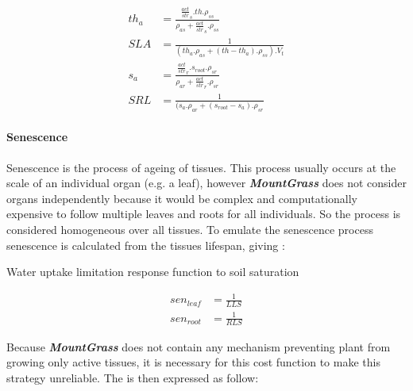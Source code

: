 \documentclass[a4paper,twoside, justified,marginals=raggedright, nobib]{tufte-handout}
\newcommand{\model}{\textit{\textbf{MountGrass }}}
\begin{document}
\begin{align}
  th_{a} &= \frac{\frac{act}{str}_{s} . th . \rho_{ss}}{\rho_{as} + \frac{act}{str}_{s} . \rho_{ss} }\\
  SLA &= \frac{1}{(th_{a} . \rho_{as} + (th - th_{a}) . \rho_{ss} ) . V_{t}}\\ 
  s_{a} &= \frac{\frac{act}{str}_{r} . s_{root} . \rho_{sr} }{ \rho_{ar} + \frac{act}{str}_{r} . \rho_{sr}}\\
  SRL &= \frac{1}{(s_{a} . \rho_{ar} + (s_{root} - s_{a}) . \rho_{sr}}
\end{align}


\paragraph{Senescence}

Senescence is the process of ageing of tissues. This process usually occurs at the scale of an individual organ (e.g. a leaf), however \model does not consider organs independently because it would be complex and computationally expensive to follow multiple leaves and roots for all individuals. So the process is considered homogeneous over all tissues. To emulate the senescence process senescence is calculated from the tissues lifespan, giving :

\begin{marginfigure}
\label{fig:derivaives}
\caption{Water uptake limitation response function to soil saturation}
\end{marginfigure}

\begin{align}
sen_{leaf} &= \frac{1}{LLS}\\
sen_{root} &= \frac{1}{RLS}
\end{align}

Because \model does not contain any mechanism preventing plant from growing only  active tissues, it is necessary for this cost function to make this strategy unreliable. The is then expressed as follow:
\end{document}
